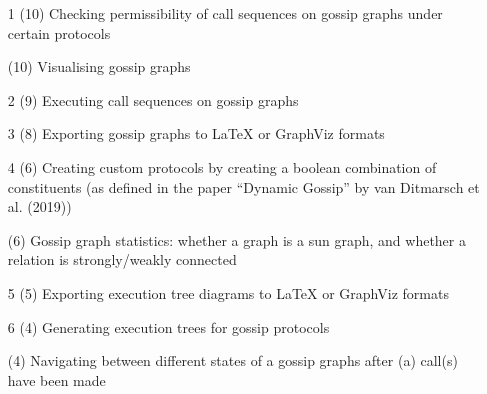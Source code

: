 \begin{enumerate}
    \item[1] (10) Checking permissibility of call sequences on gossip graphs under certain protocols	
    \item[ ] (10) Visualising gossip graphs	
    \item[2] (9)  Executing call sequences on gossip graphs	
    \item[3] (8)  Exporting gossip graphs to LaTeX or GraphViz formats	
    \item[4] (6)  Creating custom protocols by creating a boolean combination of constituents (as defined in the paper ``Dynamic Gossip'' by van Ditmarsch et al. (2019))	
    \item[ ] (6)  Gossip graph statistics: whether a graph is a sun graph, and whether a relation is strongly/weakly connected	
    \item[5] (5)  Exporting execution tree diagrams to LaTeX or GraphViz formats	
    \item[6] (4)  Generating execution trees for gossip protocols	
    \item[ ] (4)  Navigating between different states of a gossip graphs after (a) call(s) have been made
\end{enumerate}
